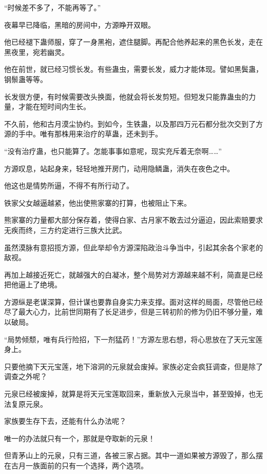 
\begin{this_body}



“时候差不多了，不能再等了。”

夜幕早已降临，黑暗的房间中，方源睁开双眼。

他已经褪下蛊师服，穿了一身黑袍，遮住腿脚。再配合他养起来的黑色长发，走在黑夜里，宛若幽灵。

他在前世，就已经习惯长发。有些蛊虫，需要长发，威力才能体现。譬如黑鬓蛊，钢鬃蛊等等。

长发很方便，有时候需要改头换面，他就会将长发剪短。但短发只能靠蛊虫的力量，才能在短时间内生长。

不久前，他和古月漠尘协约。到如今，生铁蛊，以及那四万元石都分批次交到了方源的手中。唯有那株用来治疗的草蛊，还未到手。

“没有治疗蛊，也只能算了。怎能事事如意呢，现实充斥着无奈啊……”

方源叹息，站起身来，轻轻地推开房门，动用隐鳞蛊，消失在夜色之中。

他这也是情势所逼，不得不有所行动了。

铁家父女越逼越紧，他出使熊家寨的打算，也被阻止下来。

熊家寨的力量都大部分保存着，使得白家、古月家不敢去过分逼迫，因此索赔要求无疾而终，三方约定进行三族大比武。

虽然漠脉有意招揽方源，但此举却令方源深陷政治斗争当中，引起其余各个家老的敌视。

再加上越接近死亡，就越强大的白凝冰，整个局势对方源越来越不利，简直是已经把他逼上了绝境。

方源纵是老谋深算，但计谋也要靠自身实力来支撑。面对这样的局面，尽管他已经尽了最大心力，比前世同期有了长足进步，但是三转初阶的修为仍旧不够分量，难以破局。

“局势倾颓，唯有兵行险招，下一剂猛药！”方源左思右想，将心思放在了天元宝莲身上。

只要他摘下天元宝莲，地下溶洞的元泉就会废掉。家族必定会疯狂调查，但是除了调查之外呢？

元泉已经被废掉，就算是将天元宝莲取回来，重新放入元泉当中，甚至毁掉，也无法复原元泉。

家族要生存下去，还能有什么办法呢？

唯一的办法就只有一个，那就是夺取新的元泉！

但青茅山上的元泉，只有三道，各被三家占据。其中一道如果被方源毁了，那么摆在古月一族面前的只有一个选择，两个选项。


\end{this_body}
